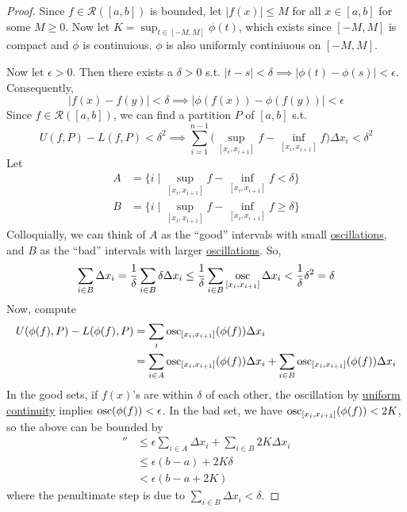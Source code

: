   \begin{proof}
    Since $f \in \mathcal{R}([a, b])$ is bounded, let $|f(x)| \leq M$ for all $x \in [a, b]$ for some $M \geq 0$. Now let $K = \sup_{t \in [-M, M]} \phi(t)$, which exists since $[-M, M]$ is compact and $\phi$ is continuious. $\phi$ is also uniformly continiuous on $[-M, M]$. 

    Now let $\epsilon > 0$. Then there exists a $\delta > 0$ s.t. $|t - s| < \delta \implies |\phi(t) - \phi(s)| < \epsilon$. Consequently, 
    \begin{equation}
      |f(x) - f(y)| < \delta \implies |\phi(f(x)) - \phi(f(y))| < \epsilon
    \end{equation} 
    Since $f \in \mathcal{R}([a, b])$, we can find a partition $P$ of $[a, b]$ s.t. 
    \begin{equation}
      U(f, P) - L(f, P) < \delta^2 \implies \sum_{i=1}^{n-1} \big( \sup_{[x_i, x_{i+1}]} f - \inf_{[x_i, x_{i+1}]} f \big) \Delta x_i < \delta^2
    \end{equation} 
    Let 
    \begin{align}
      A & = \{ i \mid \sup_{[x_i, x_{i+1}]} f - \inf_{[x_i, x_{i+1}]} f < \delta \} \\ 
      B & = \{ i \mid \sup_{[x_i, x_{i+1}]} f - \inf_{[x_i, x_{i+1}]} f \geq \delta \} 
    \end{align} 
    Colloquially, we can think of $A$ as the ``good'' intervals with small \hyperref[def:oscillation]{oscillations}, and $B$ as the ``bad'' intervals with larger \hyperref[def:oscillation]{oscillations}. So, 
    \begin{equation}
      \sum_{i \in B} \Delta x_i = \frac{1}{\delta} \sum_{i \in B} \delta \Delta x_i \leq \frac{1}{\delta} \sum_{i \in B} \mathop{\operatorname{osc}}_{[x_i, x_{i+1}]} \Delta x_i < \frac{1}{\delta} \delta^2 = \delta
    \end{equation}
    Now, compute 
    \begin{align}
      U(\phi(f), P) - L(\phi(f), P) & = \sum_i \operatorname{osc}_{[x_i, x_{i+1}]} (\phi(f)) \Delta x_i  \\ 
                                    & = \sum_{i \in A} \operatorname{osc}_{[x_i, x_{i+1}]} (\phi(f)) \Delta x_i + \sum_{i \in B} \operatorname{osc}_{[x_i, x_{i+1}]} (\phi(f)) \Delta x_i 
    \end{align}
    In the good sets, if $f(x)$'s are within $\delta$ of each other, the oscillation by \hyperref[def:uniform-continuity]{uniform continuity} implies $\operatorname{osc}(\phi(f)) < \epsilon$. In the bad set, we have $\operatorname{osc}_{[x_i, x_{i+1}]} (\phi(f)) < 2K$, so the above can be bounded by 
    \begin{align}
      '' & \leq \epsilon \sum_{i \in A} \Delta x_i + \sum_{i \in B} 2K \Delta x_i \\
         & \leq \epsilon (b - a) + 2K \delta \\
         & < \epsilon (b - a + 2K)
    \end{align}
    where the penultimate step is due to $\sum_{i \in B} \Delta x_i < \delta$. 
  \end{proof}

